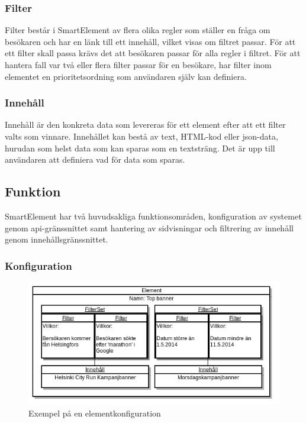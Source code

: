 \subsubsection{Filter}

Filter består i SmartElement av flera olika regler som ställer en fråga om besökaren och har en länk till ett innehåll, vilket visas om filtret passar. För att ett filter skall passa krävs det att besökaren passar för alla regler i filtret. För att hantera fall var två eller flera filter passar för en besökare, har filter inom elementet en prioritetsordning som användaren själv kan definiera.

\subsubsection{Innehåll}

Innehåll är den konkreta data som levereras för ett element efter att ett filter valts som vinnare. Innehållet kan bestå av text, HTML-kod eller \gls{json}-data, hurudan som helst data som kan sparas som en textsträng. Det är upp till användaren att definiera vad för data som sparas.

\subsection{Funktion}

SmartElement har två huvudsakliga funktionsområden, konfiguration av systemet genom \acrshort{api}-gränssnittet samt hantering av sidvisningar och filtrering av innehåll genom innehållsgränssnittet.

\subsubsection{Konfiguration}

\begin{figure}[h!]
\centering
\includegraphics[width=150mm]{assets/images/smelementelement.png}
\caption{Exempel på en elementkonfiguration}
\label{smelementelement}
\end{figure}

